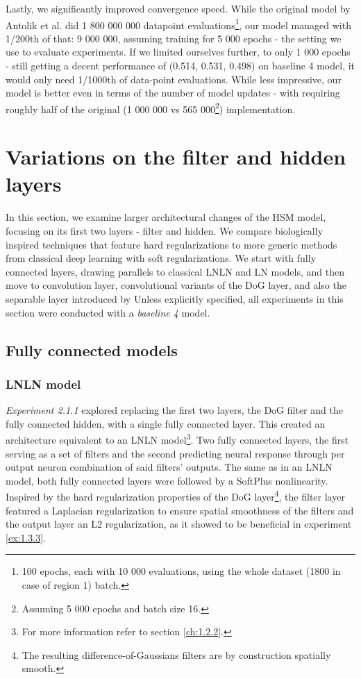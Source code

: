 Lastly, we significantly improved convergence speed. While the original model by Antolik et al. did 1 800 000 000 datapoint evaluations\footnote{100 epochs, each with 10 000 evaluations, using the whole dataset (1800 in case of region 1) batch.}, our model managed with 1/200th of that: 9 000 000, assuming training for 5 000 epochs - the setting we use to evaluate experiments. If we limited ourselves further, to only 1 000 epochs - still getting a decent performance of (0.514, 0.531, 0.498) on baseline 4 model, it would only need 1/1000th of data-point evaluations. While less impressive, our model is better even in terms of the number of model updates - with requiring roughly half of the original (1 000 000 vs 565 000\footnote{Assuming 5 000 epochs and batch size 16.}) implementation.

\section{Variations on the filter and hidden layers}
In this section, we examine larger architectural changes of the HSM model, focusing on its first two layers - filter and hidden. We compare biologically inspired techniques that feature hard regularizations to more generic methods from classical deep learning with soft regularizations. We start with fully connected layers, drawing parallels to classical LNLN and LN models, and then move to convolution layer, convolutional variants of the DoG layer, and also the separable layer introduced by \cite{klindt} Unless explicitly specified, all experiments in this section were conducted with a \textit{baseline 4} model.

\subsection{Fully connected models}
\subsubsection{LNLN model}\label{ex:2.1.1}

\textit{Experiment 2.1.1} explored replacing the first two layers, the DoG filter and the fully connected hidden, with a single fully connected layer. This created an architecture equivalent to an LNLN model\footnote{For more information refer to section \ref{ch:1.2.2}.}. Two fully connected layers, the first serving as a set of filters and the second predicting neural response through per output neuron combination of said filters’ outputs. The same as in an LNLN model, both fully connected layers were followed by a SoftPlus nonlinearity. Inspired by the hard regularization properties of the DoG layer\footnote{The resulting difference-of-Gaussians filters are by construction spatially smooth.}, the filter layer featured a Laplacian regularization to ensure spatial smoothness of the filters and the output layer an L2 regularization, as it showed to be beneficial in experiment \ref{ex:1.3.3}.

